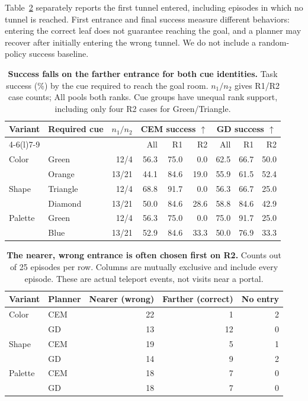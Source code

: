 Table~\ref{tab:firstentrance} separately reports the first tunnel entered,
including episodes in which no tunnel is reached. First entrance and final
success measure different behaviors: entering the correct leaf does not
guarantee reaching the goal, and a planner may recover after initially
entering the wrong tunnel. We do not include a random-policy success baseline.
\begin{table}[!htbp]
\centering
\caption{\textbf{Success falls on the farther entrance for both cue identities.}
Task success (\%) by the cue required to reach the goal room.
$n_1/n_2$ gives R1/R2 case counts; All pools both ranks.
Cue groups have unequal rank support, including only four R2 cases for
Green/Triangle.}
\label{tab:cuebyrank}
\renewcommand{\arraystretch}{1.08}
\setlength{\tabcolsep}{3pt}
\begin{tabular*}{\linewidth}{@{\extracolsep{\fill}}llrrrrrrr@{}}
\toprule
Variant & Required cue & $n_1/n_2$ & \multicolumn{3}{c}{CEM success $\uparrow$} & \multicolumn{3}{c}{GD success $\uparrow$} \\
\cmidrule(lr){4-6}\cmidrule(l){7-9}
 & & & All & R1 & R2 & All & R1 & R2 \\
\midrule
Color & Green & 12/4 & 56.3 & 75.0 & 0.0 & 62.5 & 66.7 & 50.0 \\
 & Orange & 13/21 & 44.1 & 84.6 & 19.0 & 55.9 & 61.5 & 52.4 \\
\addlinespace[2pt]
Shape & Triangle & 12/4 & 68.8 & 91.7 & 0.0 & 56.3 & 66.7 & 25.0 \\
 & Diamond & 13/21 & 50.0 & 84.6 & 28.6 & 58.8 & 84.6 & 42.9 \\
\addlinespace[2pt]
Palette & Green & 12/4 & 56.3 & 75.0 & 0.0 & 75.0 & 91.7 & 25.0 \\
 & Blue & 13/21 & 52.9 & 84.6 & 33.3 & 50.0 & 76.9 & 33.3 \\
\bottomrule
\end{tabular*}
\end{table}

\begin{table}[!htbp]
\centering
\caption{\textbf{The nearer, wrong entrance is often chosen first on R2.}
Counts out of 25 episodes per row. Columns are mutually exclusive and
include every episode. These are actual teleport events, not visits near
a portal.}
\label{tab:firstentrance}
\begin{tabular*}{\linewidth}{@{\extracolsep{\fill}}llrrr@{}}
\toprule
Variant & Planner & Nearer (wrong) & Farther (correct) & No entry \\
\midrule
Color & CEM & 22 & 1 & 2 \\
 & GD & 13 & 12 & 0 \\
Shape & CEM & 19 & 5 & 1 \\
 & GD & 14 & 9 & 2 \\
Palette & CEM & 18 & 7 & 0 \\
 & GD & 18 & 7 & 0 \\
\bottomrule
\end{tabular*}
\end{table}

